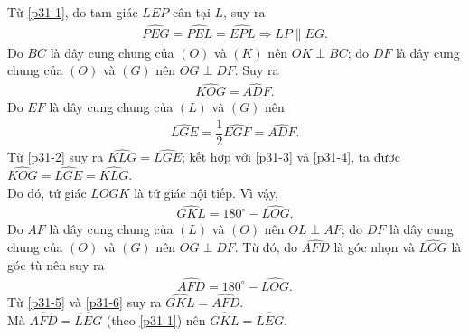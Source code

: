 \begin{bt}
{{
		}
		\noindent
		Từ \eqref{p31-1}, do tam giác $LEP$ cân tại $L$, suy ra
		\begin{align}
		\widehat{PEG}=\widehat{PEL}=\widehat{EPL} \Rightarrow LP \parallel EG. \label{p31-2}
		\end{align}
		Do $BC$ là dây cung chung của $(O)$ và $(K)$ nên $OK \perp BC$; do $DF$ là dây cung chung của $(O)$ và $(G)$ nên $OG \perp DF$. Suy ra
		\begin{align}
		\widehat{KOG}=\widehat{ADF}. \label{p31-3}
		\end{align}
		Do $EF$ là dây cung chung của $(L)$ và $(G)$ nên
		\begin{align}
		\widehat{LGE}=\dfrac{1}{2}\widehat{EGF}=\widehat{ADF}. \label{p31-4}
		\end{align}
		Từ \eqref{p31-2} suy ra $\widehat{KLG}=\widehat{LGE}$; kết hợp với \eqref{p31-3} và \eqref{p31-4}, ta được $\widehat{KOG}=\widehat{LGE}=\widehat{KLG}$.\\
		Do đó, tứ giác $LOGK$ là tứ giác nội tiếp. Vì vậy,
		\begin{align}
		\widehat{GKL}=180^\circ-\widehat{LOG}. \label{p31-5}
		\end{align}
		Do $AF$ là dây cung chung của $(L)$ và $(O)$ nên $OL \perp AF$; do $DF$ là dây cung chung của $(O)$ và $(G)$ nên $OG \perp DF$. Từ đó, do $\widehat{AFD}$ là góc nhọn và $\widehat{LOG}$ là góc tù nên suy ra
		\begin{align}
		\widehat{AFD}=180^\circ-\widehat{LOG}. \label{p31-6}
		\end{align}
		Từ \eqref{p31-5} và \eqref{p31-6} suy ra $\widehat{GKL}=\widehat{AFD}$.\\
		Mà $\widehat{AFD}=\widehat{LEG}$ (theo \eqref{p31-1}) nên $\widehat{GKL}=\widehat{LEG}$.\\
}
\end{bt}
